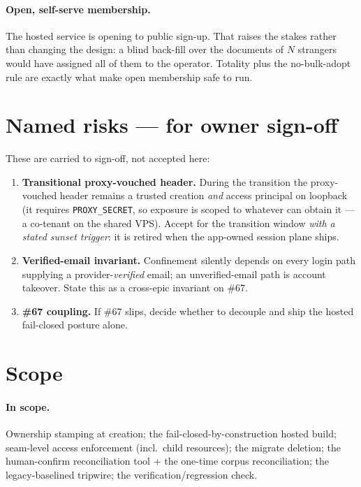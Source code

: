 \documentclass[11pt]{article}
\begin{document}
\paragraph{Open, self-serve membership.} The hosted service is opening to public sign-up. That
raises the stakes rather than changing the design: a blind back-fill over the documents of $N$
strangers would have assigned all of them to the operator. Totality plus the no-bulk-adopt rule
are exactly what make open membership safe to run.

\section{Named risks --- for owner sign-off}
\label{sec:risks}

These are carried to sign-off, not accepted here:

\begin{enumerate}[leftmargin=1.6em]
  \item \textbf{Transitional proxy-vouched header.} During the transition the proxy-vouched
  header remains a trusted creation \emph{and} access principal on loopback (it requires
  \texttt{PROXY\_SECRET}, so exposure is scoped to whatever can obtain it --- a co-tenant on the
  shared VPS). Accept for the transition window \emph{with a stated sunset trigger}: it is retired
  when the app-owned session plane ships.
  \item \textbf{Verified-email invariant.} Confinement silently depends on every login path
  supplying a provider-\emph{verified} email; an unverified-email path is account takeover. State
  this as a cross-epic invariant on \#67.
  \item \textbf{\#67 coupling.} If \#67 slips, decide whether to decouple and ship the hosted
  fail-closed posture alone.
\end{enumerate}

\section{Scope}
\label{sec:scope}

\paragraph{In scope.} Ownership stamping at creation; the fail-closed-by-construction hosted
build; seam-level access enforcement (incl.\ child resources); the migrate deletion; the
human-confirm reconciliation tool + the one-time corpus reconciliation; the legacy-baselined
tripwire; the verification/regression check.
\end{document}
